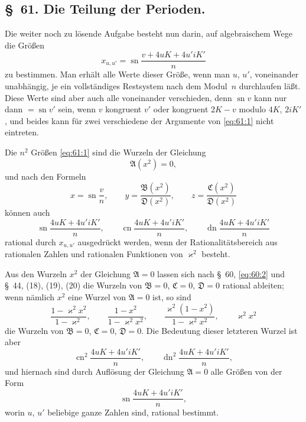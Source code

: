 \documentclass[11pt,a4paper]{article}
\theoremstyle{plain}
\theoremstyle{remark}
\newcommand{\A}{\mathfrak{A}}
\newcommand{\B}{\mathfrak{B}}
\newcommand{\CC}{\mathfrak{C}}
\newcommand{\D}{\mathfrak{D}}
\begin{document}
\subsection*{§~61. Die Teilung der Perioden.}

Die weiter noch zu lösende Aufgabe besteht nun darin, auf
algebraischem Wege die Größen
\begin{equation}\label{eq:61:1}
x_{u,u'} = \operatorname{sn}\frac{v+4uK+4u'iK'}{n}
\end{equation}
zu bestimmen. Man erhält alle Werte dieser Größe, wenn man
$u$, $u'$, voneinander unabhängig, je ein vollständiges
Restsystem nach dem Modul~$n$ durchlaufen läßt. Diese Werte
sind aber auch alle voneinander verschieden, denn
$\operatorname{sn}v$ kann nur dann $= \operatorname{sn}v'$
sein, wenn $v$ kongruent $v'$ oder kongruent $2K-v$ modulo
$4K$, $2iK'$, und beides kann für zwei verschiedene der
Argumente von \eqref{eq:61:1} nicht eintreten.

Die $n^2$ Größen \eqref{eq:61:1} sind die Wurzeln der Gleichung
\begin{equation}\label{eq:61:2}
\A(x^2) = 0,
\end{equation}
und nach den Formeln
\[
x = \operatorname{sn}\frac{v}{n},\qquad
y = \frac{\B(x^2)}{\D(x^2)},\qquad
z = \frac{\CC(x^2)}{\D(x^2)}
\]
können auch
\[
\operatorname{sn}\frac{4uK+4u'iK'}{n},\qquad
\operatorname{cn}\frac{4uK+4u'iK'}{n},\qquad
\operatorname{dn}\frac{4uK+4u'iK'}{n}
\]
rational durch $x_{u,u'}$ ausgedrückt werden, wenn der
Rationalitätsbereich aus rationalen Zahlen und rationalen
Funktionen von $\varkappa^2$ besteht.

Aus den Wurzeln $x^2$ der Gleichung $\A=0$ lassen sich nach
§~60, \eqref{eq:60:2} und §~44, (18), (19), (20) die Wurzeln
von $\B=0$, $\CC=0$, $\D=0$ rational ableiten; wenn nämlich
$x^2$ eine Wurzel von $\A=0$ ist, so sind
\[
\frac{1-\varkappa^2x^2}{1-\varkappa^2},\qquad
\frac{1-x^2}{1-\varkappa^2x^2},\qquad
\frac{\varkappa^2(1-x^2)}{1-\varkappa^2x^2},\qquad
\varkappa^2x^2
\]
die Wurzeln von $\B=0$, $\CC=0$, $\D=0$. Die Bedeutung dieser
letzteren Wurzel ist aber
\[
\operatorname{cn}^2\frac{4uK+4u'iK'}{n},\qquad
\operatorname{dn}^2\frac{4uK+4u'iK'}{n},
\]
und hiernach sind durch Auflösung der Gleichung $\A=0$ alle
Größen von der Form
\[
\operatorname{sn}\frac{4uK+4u'iK'}{n},
\]
worin $u$, $u'$ beliebige ganze Zahlen sind, rational bestimmt.
\end{document}
